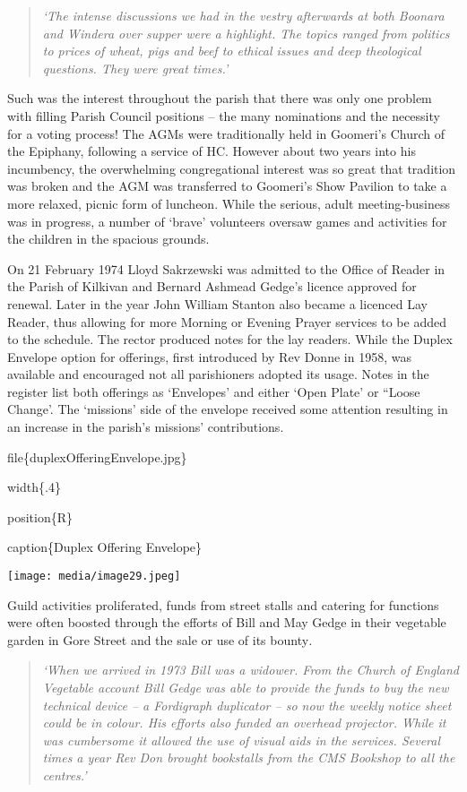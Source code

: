 \begin{quote}
\emph{`The intense discussions we had in the vestry afterwards at both
Boonara and Windera over supper were a highlight. The topics ranged from
politics to prices of wheat, pigs and beef to ethical issues and deep
theological questions. They were great times.'}
\end{quote}

Such was the interest throughout the parish that there was only one
problem with filling Parish Council positions -- the many nominations
and the necessity for a voting process! The AGMs were traditionally held
in Goomeri's Church of the Epiphany, following a service of HC. However
about two years into his incumbency, the overwhelming congregational
interest was so great that tradition was broken and the AGM was
transferred to Goomeri's Show Pavilion to take a more relaxed, picnic
form of luncheon. While the serious, adult meeting-business was in
progress, a number of `brave' volunteers oversaw games and activities
for the children in the spacious grounds.

On 21 February 1974 Lloyd Sakrzewski was admitted to the Office of
Reader in the Parish of Kilkivan and Bernard Ashmead Gedge's licence
approved for renewal. Later in the year John William Stanton also became
a licenced Lay Reader, thus allowing for more Morning or Evening Prayer
services to be added to the schedule. The rector produced notes for the
lay readers. While the Duplex Envelope option for offerings, first
introduced by Rev Donne in 1958, was available and encouraged not all
parishioners adopted its usage. Notes in the register list both
offerings as `Envelopes' and either `Open Plate' or ``Loose Change'. The
`missions' side of the envelope received some attention resulting in an
increase in the parish's missions' contributions.

file\{duplexOfferingEnvelope.jpg\}

width\{.4\}

position\{R\}

caption\{Duplex Offering Envelope\}

\texttt{[image: media/image29.jpeg]}

Guild activities proliferated, funds from street stalls and catering for
functions were often boosted through the efforts of Bill and May Gedge
in their vegetable garden in Gore Street and the sale or use of its
bounty\emph{.}

\begin{quote}
\emph{`When we arrived in 1973 Bill was a widower. From the Church of
England Vegetable account Bill Gedge was able to provide the funds to
buy the new technical device -- a Fordigraph duplicator -- so now the
weekly notice sheet could be in colour. His efforts also funded an
overhead projector. While it was cumbersome it allowed the use of visual
aids in the services. Several times a year Rev Don brought bookstalls
from the CMS Bookshop to all the centres.'}
\end{quote}

